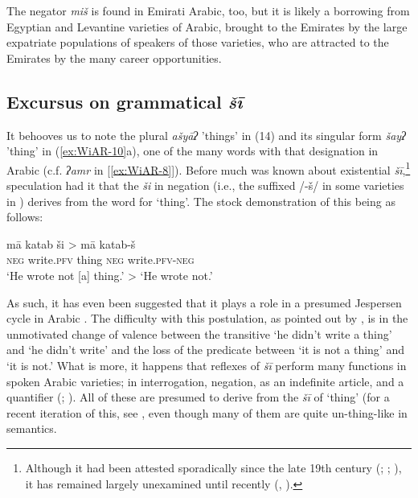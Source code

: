 \documentclass[output=paper]{langsci/langscibook}
\begin{document}
The negator \textit{miš} is found in Emirati Arabic, too, but it is likely a borrowing from Egyptian and Levantine varieties of Arabic, brought to the Emirates by the large expatriate populations of speakers of those varieties, who are attracted to the Emirates by the many career opportunities.

\subsection{Excursus on grammatical \textit{šī}} \label{s:WiAR-3.3}

It behooves us to note the plural \textit{ašyāʔ} ’things’ in (14) and its singular form \textit{šayʔ} ’thing’ in (\ref{ex:WiAR-10}a), one of the many words with that designation in Arabic (c.f. \textit{ʔamr} in [\ref{ex:WiAR-8}]). Before much was known about existential \textit{šī},\footnote{Although it had been attested sporadically since the late 19th century  (\citealp[112]{reinhardt1894a}; \citealp[170]{johnstone1967a}; \citealp[24]{brockett1985a}), it has remained largely unexamined until recently (\citealp[24--28]{holes2016a}, \citealp{wilmsen2017a, wilmsen2020a}).} speculation had it that the \textit{ši} in negation (i.e., the suffixed /-š/ in some varieties in ) derives from the word for ‘thing’. The stock demonstration of this being as follows:

\ea \label{ex:WiAR-17}
	\gll mā katab ši > mā katab-š\\
	\textsc{neg} write.\textsc{pfv} thing {} \textsc{neg} write.\textsc{pfv-neg}\\
	\glt ‘He wrote not [a] thing.’ > ‘He wrote not.’
\z

As such, it has even been suggested that it plays a role in a presumed Jespersen cycle in Arabic \citep{lucas2007a}. The difficulty with this postulation, as pointed out by \citet[139]{woidich1990a}, is in the unmotivated change of valence between the transitive ‘he didn’t write a thing’ and ‘he didn’t write’ and the loss of the predicate between ‘it is not a thing’ and ‘it is not.’ What is more, it happens that reflexes of \textit{šī} perform many functions in spoken Arabic varieties; in interrogation, negation, as an indefinite article, and a quantifier (\citealp[44--63]{wilmsen2014a}; \citealp{wilmsen2017a}). All of these are presumed to derive from the \textit{šī} of ‘thing’ (for a recent iteration of this, see \citet{glanville2018a}, even though many of them are quite un-thing-like in semantics.
\end{document}
